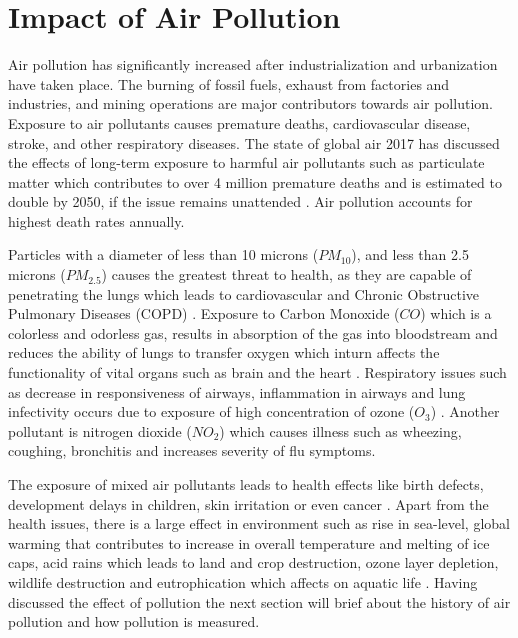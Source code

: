 \section{Impact of Air Pollution}

Air pollution has significantly increased after industrialization and urbanization have taken place. The burning of fossil fuels, exhaust from factories and industries, and mining operations are major contributors towards air pollution. Exposure to air pollutants causes premature deaths, cardiovascular disease, stroke, and other respiratory diseases. The state of global air 2017 has discussed the effects of long-term exposure to harmful air pollutants such as particulate matter which contributes to over 4 million premature deaths and is estimated to double by 2050, if the issue remains unattended \cite{HealthEffectsInstitute2017}. Air pollution accounts for highest death rates annually. 

\par

Particles with a diameter of less than 10 microns ($PM_{10}$), and less than 2.5 microns ($PM_{2.5}$) causes the greatest threat to health, as they are capable of penetrating the lungs which leads to cardiovascular and Chronic Obstructive Pulmonary Diseases (COPD) \cite{who} \cite{Tian2016}. Exposure to Carbon Monoxide ($CO$) which is a colorless and odorless gas, results in absorption of the gas into bloodstream and reduces the ability of lungs to transfer oxygen which inturn affects the functionality of vital organs such as brain and the heart \cite{Sierra-vargas2012} \cite{Golbabaei2012}. Respiratory issues such as decrease in responsiveness of airways, inflammation in airways and lung infectivity occurs due to exposure of high concentration of ozone ($O_3$) \cite{Lippmann1989}. Another pollutant is nitrogen dioxide ($NO_2$) which causes illness such as wheezing, coughing, bronchitis and increases severity of flu symptoms.
\par

 The exposure of mixed air pollutants leads to health effects like birth defects, development delays in children, skin irritation or even cancer \cite{MarilenaKampa2007}. Apart from the health issues, there is a large effect in environment such as rise in sea-level, global warming that contributes to increase in overall temperature and melting of ice caps, acid rains which leads to land and crop destruction, ozone layer depletion, wildlife destruction and eutrophication which affects on aquatic life \cite{pollutioneffect}. Having discussed the effect of pollution the next section will brief about the history of air pollution and how pollution is measured. 


